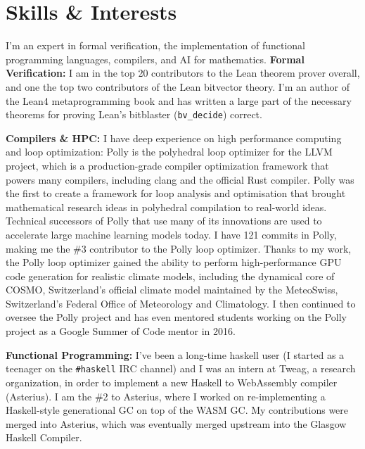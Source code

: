 \documentclass[11pt,a4paper,sans,colorlinks]{moderncv}        %
\begin{document}

\section{Skills \& Interests}

I'm an expert in formal verification, the implementation of functional programming languages, compilers, and AI for mathematics.
\textbf{Formal Verification:}
I am in the top 20 contributors to the Lean theorem prover overall, and one the top two contributors of the Lean bitvector theory.
I'm an author of the Lean4 metaprogramming book and has written a large part of the necessary theorems for proving
Lean's bitblaster (\texttt{bv\_decide}) correct.

\textbf{Compilers \& HPC:} I have deep experience on high performance computing and loop optimization: Polly is the polyhedral loop optimizer for the LLVM project, which is a production-grade compiler optimization framework that powers many compilers, including clang and the official Rust compiler. Polly was the first to create a framework for loop analysis and optimisation that brought mathematical research ideas in polyhedral compilation to real-world ideas. Technical successors of Polly that use many of its innovations are used to accelerate large machine learning models today. I have 121 commits in Polly, making me the \#3 contributor to the Polly loop optimizer. Thanks to my work, the Polly loop optimizer gained the ability to perform high-performance GPU code generation for realistic climate models, including the dynamical core of COSMO, Switzerland's official climate model maintained by the MeteoSwiss, Switzerland's Federal Office of Meteorology and Climatology. I then continued to oversee the Polly project and has even mentored students working on the Polly project as a Google Summer of Code mentor in 2016.

\textbf{Functional Programming:} I've been a long-time haskell user (I started as a teenager on the \texttt{\#haskell} IRC channel) and I was an intern at Tweag, a research organization, in order to implement a new Haskell to WebAssembly compiler (Asterius). I am the \#2 to Asterius, where I worked on re-implementing a Haskell-style generational GC on top of the WASM GC. My contributions were merged into Asterius, which was eventually merged upstream into the Glasgow Haskell Compiler.
\end{document}
